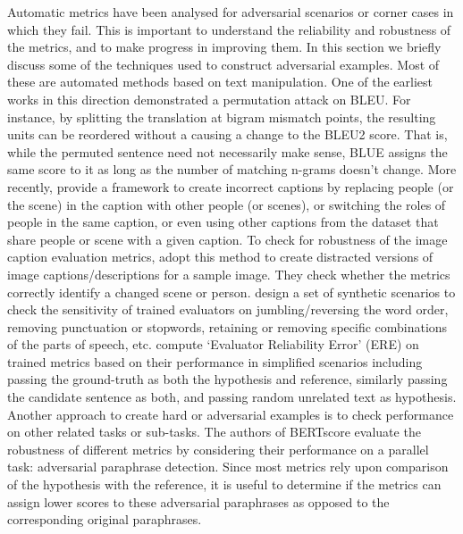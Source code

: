 Automatic metrics have been analysed for adversarial scenarios or corner cases in which they fail. This is important to understand the reliability and robustness of the metrics, and to make progress in improving them. In this section we briefly discuss some of the techniques used to construct adversarial examples. Most of these are automated methods based on text manipulation.  
One of the earliest works in this direction  demonstrated a permutation attack on BLEU. For instance, by splitting the translation at bigram mismatch points, the resulting units can be reordered without a causing a change to the BLEU2 score. That is, while the permuted sentence need not necessarily make sense, BLUE assigns the same score to it as long as the number of matching n-grams doesn't change. 
More recently,  provide a framework to create incorrect captions by replacing people (or the scene) in the caption with other people (or scenes), or switching the roles of people in the same caption, or even using other captions from the dataset that share people or scene with a given caption. To check for robustness of the image caption evaluation metrics,  adopt this method to create distracted versions of image captions/descriptions for a sample image. They check whether the metrics correctly identify a changed scene or person. 
 design a set of synthetic scenarios to check the sensitivity of trained evaluators on jumbling/reversing the word order, removing punctuation or stopwords, retaining or removing specific combinations of the parts of speech, etc.  compute `Evaluator Reliability Error' (ERE) on trained metrics based on their performance in simplified scenarios including passing the ground-truth as both the hypothesis and reference, similarly passing the candidate sentence as both, and passing random unrelated text as hypothesis. 
\\
Another approach to create hard or adversarial examples is to check performance on other related tasks or sub-tasks.  
The authors of BERTscore  evaluate the robustness of different metrics by considering their performance on a parallel task: adversarial paraphrase detection. Since most metrics rely upon comparison of the hypothesis with the reference, it is useful to determine if the metrics can assign lower scores to these adversarial paraphrases as opposed to the corresponding original paraphrases.

